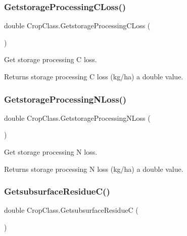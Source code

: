 \subsubsection{\texorpdfstring{GetstorageProcessingCLoss()}{GetstorageProcessingCLoss()}}
{\footnotesize\ttfamily double Crop\+Class.\+Getstorage\+Processing\+C\+Loss (\begin{DoxyParamCaption}{ }\end{DoxyParamCaption})\hspace{0.3cm}{\ttfamily [inline]}}



Get storage processing C loss. 

\begin{DoxyReturn}{Returns}
storage processing C loss (kg/ha) a double value. 
\end{DoxyReturn}
\mbox{\label{class_crop_class_ad92df9b839aeed9c78dc7b148fbce8a9}} 
\subsubsection{\texorpdfstring{GetstorageProcessingNLoss()}{GetstorageProcessingNLoss()}}
{\footnotesize\ttfamily double Crop\+Class.\+Getstorage\+Processing\+N\+Loss (\begin{DoxyParamCaption}{ }\end{DoxyParamCaption})\hspace{0.3cm}{\ttfamily [inline]}}



Get storage processing N loss. 

\begin{DoxyReturn}{Returns}
storage processing N loss (kg/ha) a double value. 
\end{DoxyReturn}
\mbox{\label{class_crop_class_a8d6aa777ea43f923f12ea3410f9d960c}} 
\subsubsection{\texorpdfstring{GetsubsurfaceResidueC()}{GetsubsurfaceResidueC()}}
{\footnotesize\ttfamily double Crop\+Class.\+Getsubsurface\+ResidueC (\begin{DoxyParamCaption}{ }\end{DoxyParamCaption})\hspace{0.3cm}{\ttfamily [inline]}}



